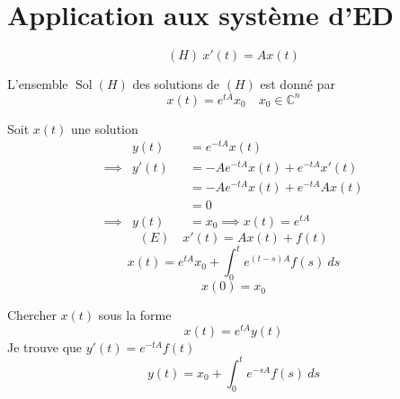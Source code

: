 \section{Application aux système d'ED}
\[
    (H) \: x'(t) = Ax(t)
\] 
\begin{theorem}
    L'ensemble $\operatorname{Sol}(H)$ des solutions de  $(H)$ est donné par
     \[
         x(t) = e^{tA}x_0 \quad x_0 \in \mathbb{C}^{n}
    \] 
\end{theorem}
Soit $x(t)$ une solution
\begin{align*}
            & y(t)  &&= e^{-tA}x(t)\\
    \implies& y'(t) &&= -Ae^{-tA}x(t) + e^{-tA}x'(t)\\
            &       &&= -Ae^{-tA}x(t) + e^{-tA}Ax(t)\\
            &       &&= 0\\
    \implies& y(t)  && = x_0 \implies x(t) = e^{tA}
\end{align*}
\[
    (E) \quad x'(t) = Ax(t) + f(t)
\] 
\[
    x(t) = e^{tA}x_0 + \int_{{0}}^{{t}} {e^{(t - s)A} f(s)} \: d{s} 
\] 
\[
x(0) = x_0
\] 
\begin{preuve}
   Chercher $x(t)$  sous la forme 
   \[
       x(t) = e^{tA}y(t)
   \] 
   Je trouve que $y'(t) = e^{-tA}f(t)$
    \[
        y(t) = x_0 + \int_{{0}}^{{t}} {e^{-sA}f(s)} \: d{s}
   \] 
\end{preuve}
